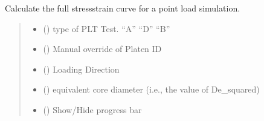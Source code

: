 \documentclass[letterpaper,10pt,english]{sphinxmanual}
\begin{document}
\begin{fulllineitems}
\begin{fulllineitems}
\label{\detokenize{pyfdempp:pyfdempp.pyfdempp.Model.complete_PLT_stress_strain}}
\pysigstartsignatures
{}
\pysigstopsignatures
\sphinxAtStartPar
Calculate the full stress\sphinxhyphen{}strain curve for a point load simulation.
\begin{quote}\begin{description}
\begin{itemize}
\item {} 
\sphinxAtStartPar
{} () \textendash{} type of PLT Test. “A” “D” “B”

\item {} 
\sphinxAtStartPar
{} () \textendash{} Manual override of Platen ID

\item {} 
\sphinxAtStartPar
{} () \textendash{} Loading Direction

\item {} 
\sphinxAtStartPar
{} () \textendash{} equivalent core diameter (i.e., the value of De\_squared)

\item {} 
\sphinxAtStartPar
{} () \textendash{} Show/Hide progress bar

\end{itemize}


\end{description}
\end{quote}
\end{fulllineitems}
\end{fulllineitems}
\end{document}
